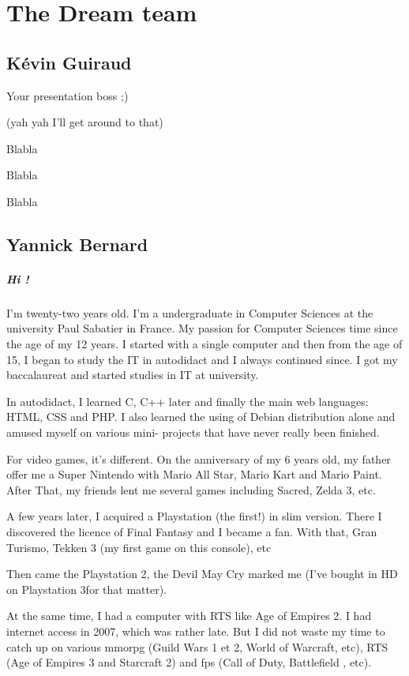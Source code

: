 \documentclass[a4paper,12pt]{book}
\begin{document}
\chapter{The Dream team}
\section*{K\'{e}vin Guiraud}
Your presentation boss ;)

(yah yah I'll get around to that)

Blabla

Blabla

Blabla
\section*{Yannick Bernard}
\paragraph{Hi !} I'm twenty-two years old. I'm a undergraduate in Computer Sciences at the university Paul Sabatier in France. My passion for Computer Sciences time since the age of my 12 years. I started with a single computer and then from the age of 15, I began to study the IT in autodidact and I always continued since. I got my baccalaureat and started studies in IT at university.

In autodidact, I learned C, C++ later and finally the main web languages: HTML, CSS and PHP. I also learned the using of Debian distribution alone and amused myself on various mini- projects that have never really been finished.

For video games, it's different. On the anniversary of my 6 years old, my father offer me a Super Nintendo with Mario All Star, Mario Kart and Mario Paint. After That, my friends lent me several games including Sacred, Zelda 3, etc.

A few years later, I acquired a Playstation (the first!) in slim version. There I discovered the licence of Final Fantasy and I became a fan. With that, Gran Turismo, Tekken 3 (my first game on this console), etc

Then came the Playstation 2, the Devil May Cry marked me (I've bought in HD on Playstation 3for that matter).

At the same time, I had a computer with RTS like Age of Empires 2. I had internet access in 2007, which was rather late. But I did not waste my time to catch up on various mmorpg (Guild Wars 1 et 2, World of Warcraft, etc), RTS (Age of Empires 3 and Starcraft 2) and fps (Call of Duty, Battlefield , etc).
\end{document}
